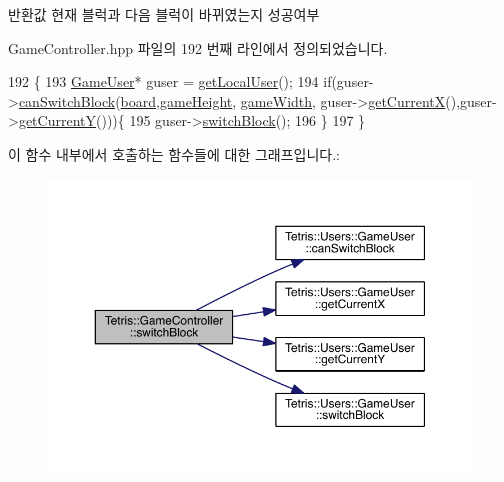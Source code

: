 \begin{DoxyReturn}{반환값}
현재 블럭과 다음 블럭이 바뀌였는지 성공여부 
\end{DoxyReturn}


Game\+Controller.\+hpp 파일의 192 번째 라인에서 정의되었습니다.


\begin{DoxyCode}
192                           \{
193             \hyperlink{class_tetris_1_1_users_1_1_game_user}{GameUser}* guser = \hyperlink{class_tetris_1_1_game_controller_abc67d4b309ce2886b43a3b4e0af22abc}{getLocalUser}();
194             \textcolor{keywordflow}{if}(guser->\hyperlink{class_tetris_1_1_users_1_1_game_user_a8a777ef1ffbbc53ebae4172830863eb4}{canSwitchBlock}(\hyperlink{class_tetris_1_1_game_controller_a7725b6cec9459a6bffaa3e29dd1c5196}{board},\hyperlink{class_tetris_1_1_game_controller_a8e3adc647ed382de0ff541417bea9b33}{gameHeight},
      \hyperlink{class_tetris_1_1_game_controller_a439f215918db4127fcb44cf9d501ed63}{gameWidth}, guser->\hyperlink{class_tetris_1_1_users_1_1_game_user_ad25eace96bd27ae6df4a0c0d506be730}{getCurrentX}(),guser->\hyperlink{class_tetris_1_1_users_1_1_game_user_af5bd7ff0b575af1b42b093488cff97e2}{getCurrentY}()))\{
195                 guser->\hyperlink{class_tetris_1_1_users_1_1_game_user_a1d1efa857420c82248fd12da9c08ef77}{switchBlock}();
196             \}
197         \}
\end{DoxyCode}
이 함수 내부에서 호출하는 함수들에 대한 그래프입니다.\+:
\nopagebreak
\begin{figure}[H]
\begin{center}
\leavevmode
\includegraphics[width=350pt]{db/dd2/class_tetris_1_1_game_controller_ad203991dc134e2ea36c9c40326da55c1_cgraph}
\end{center}
\end{figure}
\mbox{\label{class_tetris_1_1_game_controller_ab96e22daad51119b35cbee8cfb7385ef}} 
